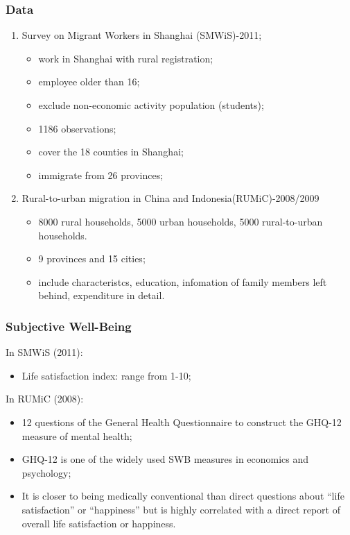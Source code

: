 \documentclass[10pt]{beamer}
\begin{document}
\begin{frame}[c]\frametitle{Data}
\begin{enumerate}
    \item Survey on Migrant Workers in Shanghai (SMWiS)-2011;
    \begin{itemize}
        \item work in Shanghai with rural registration;
        \item employee older than 16;
        \item exclude non-economic activity population (students);
        \item 1186 observations;
        \item cover the 18 counties in Shanghai;
        \item immigrate from 26 provinces;
    \end{itemize}
    \item Rural-to-urban migration in China and Indonesia(RUMiC)-2008/2009
    \begin{itemize}
        \item 8000 rural households, 5000 urban households, 5000 rural-to-urban households.
        \item 9 provinces and 15 cities;
        \item include characteristcs, education, infomation of family members left behind, expenditure in detail.
    \end{itemize}

\end{enumerate}

\end{frame}

\begin{frame}[c]\frametitle{Subjective Well-Being}
\alert{In SMWiS (2011):}
\begin{itemize}
    \item Life satisfaction index: range from 1-10;
\end{itemize}

\alert{In RUMiC (2008):}
\begin{itemize}
    \item 12 questions of the General Health Questionnaire to construct the GHQ-12 measure of mental health;
    \item GHQ-12 is one of the widely used SWB measures in economics and psychology;
    \item It is closer to being medically conventional than direct questions about “life satisfaction” or “happiness” but is highly correlated with a direct report of overall life satisfaction or happiness.
\end{itemize}
\end{frame}
\end{document}

